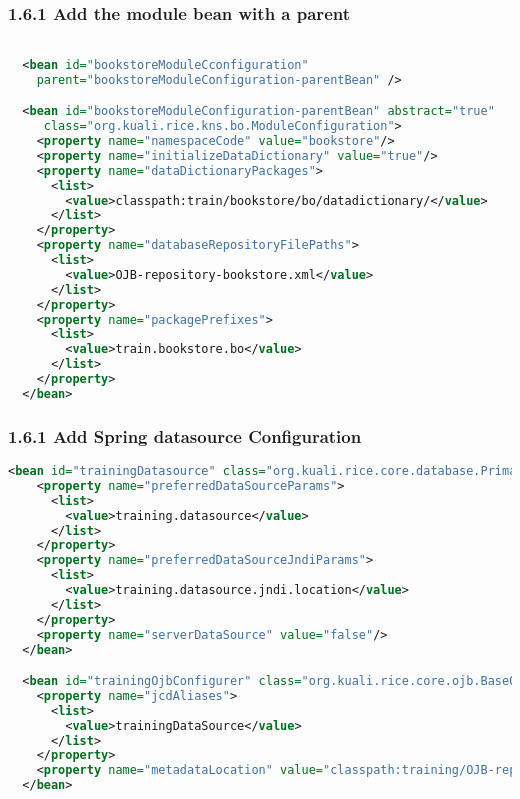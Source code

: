 \subsubsection*{1.6.1 Add the module bean with a parent}
\begin{lstlisting}[language=xml,backgroundcolor=\color{ubergray},caption={Base
  SpringBeans.xml},frame=single,breaklines=true]

  <bean id="bookstoreModuleCconfiguration"
    parent="bookstoreModuleConfiguration-parentBean" />

  <bean id="bookstoreModuleConfiguration-parentBean" abstract="true"
     class="org.kuali.rice.kns.bo.ModuleConfiguration">
    <property name="namespaceCode" value="bookstore"/>
    <property name="initializeDataDictionary" value="true"/>
    <property name="dataDictionaryPackages">
      <list>
        <value>classpath:train/bookstore/bo/datadictionary/</value>
      </list>
    </property>
    <property name="databaseRepositoryFilePaths">
      <list>
	    <value>OJB-repository-bookstore.xml</value>
      </list>
    </property>
    <property name="packagePrefixes">
      <list>
        <value>train.bookstore.bo</value>
      </list>
    </property>
  </bean>
\end{lstlisting}

\subsubsection*{1.6.1 Add Spring datasource Configuration}
\begin{lstlisting}[language=xml,backgroundcolor=\color{ubergray},caption={Spring
    datasource setup},frame=single,breaklines=true]
  <bean id="trainingDatasource" class="org.kuali.rice.core.database.PrimaryDataSourceFactoryBean" lazy-init="true">
    <property name="preferredDataSourceParams">
      <list>
        <value>training.datasource</value>
      </list>
    </property>
    <property name="preferredDataSourceJndiParams">
      <list>
        <value>training.datasource.jndi.location</value>
      </list>
    </property>
    <property name="serverDataSource" value="false"/>
  </bean>

  <bean id="trainingOjbConfigurer" class="org.kuali.rice.core.ojb.BaseOjbConfigurer">
    <property name="jcdAliases">
      <list>
        <value>trainingDataSource</value>
      </list>
    </property>
    <property name="metadataLocation" value="classpath:training/OJB-repository-bookstore.xml" />
  </bean>
\end{lstlisting}

